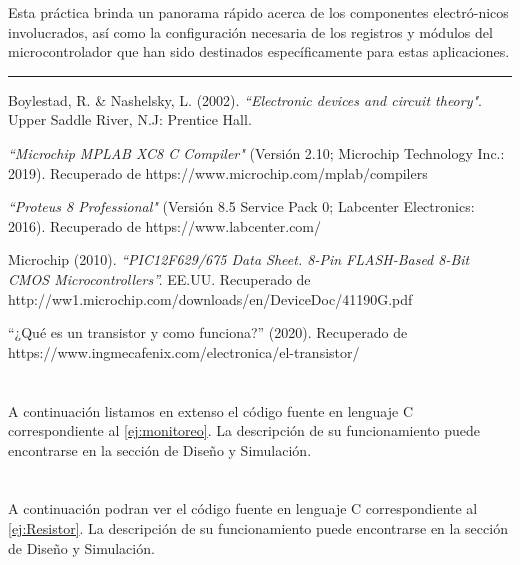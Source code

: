 \documentclass[a4paper]{article}
\let\originalappendix\appendix
\renewcommand{\appendix}{%
    \newpage\originalappendix\pagenumbering{gobble}%
    \renewcommand\thesection{Anexo \Alph{section}}
    \setcounter{secnumdepth}{1}
}
\begin{document}
Esta práctica brinda un panorama rápido acerca de los componentes
electró-nicos involucrados, así como la configuración necesaria de 
los registros y módulos del microcontrolador que han sido destinados
específicamente para estas aplicaciones.

\noindent\rule{\textwidth}{1pt}

\begin{thebibliography}{9}

Boylestad, R. \& Nashelsky, L. (2002). 
\textit{``Electronic devices and circuit theory"}.
Upper Saddle River, N.J: Prentice Hall.

\textit{``Microchip MPLAB XC8 C Compiler"}
(Versión 2.10; Microchip Technology Inc.: 2019).
Recuperado de https://www.microchip.com/mplab/compilers

\textit{``Proteus 8 Professional"} 
(Versión 8.5 Service Pack 0; Labcenter Electronics: 2016).
Recuperado de https://www.labcenter.com/

Microchip (2010).
\textit{``PIC12F629/675 Data Sheet. 8-Pin FLASH-Based 8-Bit CMOS 
Microcontrollers''.}
EE.UU. Recuperado de 
http://ww1.microchip.com/downloads/en/DeviceDoc/41190G.pdf

``¿Qué es un transistor y como funciona?'' (2020).
Recuperado de 
https://www.ingmecafenix.com/electronica/el-transistor/

\end{thebibliography}


\appendix

\section{}\label{ane:monitoreo}
A continuación listamos en extenso el código fuente en lenguaje C
correspondiente al \ref{ej:monitoreo}. La descripción de su 
funcionamiento puede encontrarse en la sección de Diseño y 
Simulación.

%

\newpage
\section{}\label{ane:Corriente alterna o considerable}
A continuación podran ver el  código fuente en lenguaje C correspondiente
al \ref{ej:Resistor}. La descripción de su funcionamiento puede encontrarse en
la sección de Diseño y Simulación.

%
\end{document}
